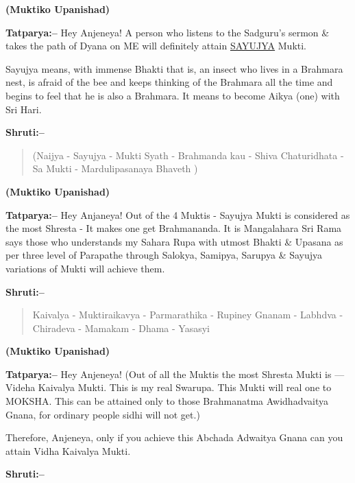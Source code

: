 \begin{flushright}
\textbf{(Muktiko Upanishad)}
\end{flushright}

\textbf{Tatparya:–} Hey Anjeneya! A person who listens to the Sadguru's sermon \& takes the path of Dyana on ME will definitely attain \underline{SAYUJYA} Mukti.

Sayujya means, with immense Bhakti that is, an insect who lives in a Brahmara nest, is afraid of the bee and keeps thinking of the Brahmara all the time and begins to feel that he is also a Brahmara. It means to become Aikya (one) with Sri Hari.

\textbf{Shruti:–}

\begin{verse}
(Naijya - Sayujya - Mukti Syath - Brahmanda kau - Shiva Chaturidhata - Sa Mukti - Mardulipasanaya Bhaveth )
\end{verse}

\begin{flushright}
\textbf{(Muktiko Upanishad)}
\end{flushright}

\textbf{Tatparya:–} Hey Anjaneya! Out of the 4 Muktis - Sayujya Mukti is considered as the most Shresta - It makes one get Brahmananda. It is Mangalahara Sri Rama says those who understands my Sahara Rupa with utmost Bhakti \& Upasana as per three level of Parapathe through Salokya, Samipya, Sarupya \& Sayujya variations of Mukti will achieve them.

\textbf{Shruti:–}

\begin{verse}
Kaivalya - Muktiraikavya - Parmarathika - Rupiney  Gnanam - Labhdva - Chiradeva - Mamakam - Dhama - Yasasyi 
\end{verse}

\begin{flushright}
\textbf{(Muktiko Upanishad)}
\end{flushright}

\textbf{Tatparya:–} Hey Anjeneya! (Out of all the Muktis the most Shresta Mukti is — Videha Kaivalya Mukti. This is my real Swarupa. This Mukti will real one to MOKSHA. This can be attained only to those Brahmanatma Awidhadvaitya Gnana, for ordinary people sidhi will not get.)

Therefore, Anjeneya, only if you achieve this Abchada Adwaitya Gnana can you attain Vidha Kaivalya Mukti.

\textbf{Shruti:–}

